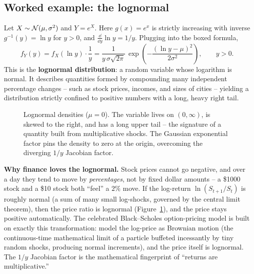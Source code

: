 \subsection{Worked example: the lognormal}

\begin{example}
\label{ch16:lognormal}
Let $X \sim \mathcal{N}(\mu,\sigma^2)$ and $Y = e^{X}$. Here $g(x) = e^x$ is strictly
increasing with inverse $g^{-1}(y) = \ln y$ for $y>0$, and $\tfrac{\dd}{\dd y}\ln y = 1/y$.
Plugging into the boxed formula,
\[
  f_Y(y) = f_X(\ln y)\cdot \frac{1}{y}
         = \frac{1}{y\,\sigma\sqrt{2\pi}}\,
           \exp\!\left(-\frac{(\ln y - \mu)^2}{2\sigma^2}\right), \qquad y>0.
\]
This is the \textbf{lognormal distribution}: a random variable whose logarithm is normal.
It describes quantities formed by compounding many independent percentage changes -- such
as stock prices, incomes, and sizes of cities -- yielding a distribution strictly confined
to positive numbers with a long, heavy right tail.
\end{example}

\begin{figure}[H]
\centering
{}
\caption{Lognormal densities ($\mu=0$). The variable lives on $(0,\infty)$, is skewed to
the right, and has a long upper tail -- the signature of a quantity built from
multiplicative shocks. The Gaussian exponential factor pins the density to zero at the origin, overcoming the diverging $1/y$ Jacobian factor.}
\label{ch16:fig-lognormal}
\end{figure}

\begin{applicationbox}
\textbf{Why finance loves the lognormal.} Stock prices cannot go negative, and over a day
they tend to move by \emph{percentages}, not by fixed dollar amounts -- a \$1000 stock and
a \$10 stock both ``feel'' a $2\%$ move. If the log-return $\ln(S_{t+1}/S_t)$ is roughly
normal (a sum of many small log-shocks, governed by the central limit theorem),
then the price ratio is lognormal (Figure~\ref{ch16:fig-lognormal}), and the price stays positive automatically. The
celebrated Black--Scholes option-pricing model is built on exactly this transformation:
model the log-price as Brownian motion (the continuous-time mathematical limit of a particle
buffeted incessantly by tiny random shocks, producing normal increments), and the price
itself is lognormal. The $1/y$ Jacobian factor is the mathematical fingerprint of ``returns
are multiplicative.''
\end{applicationbox}

